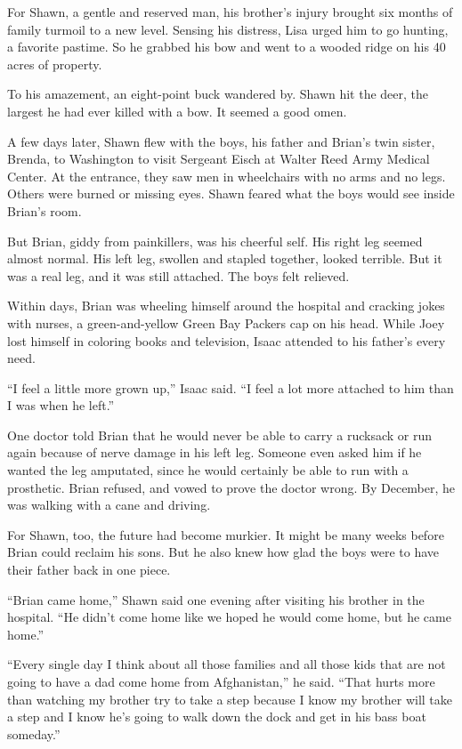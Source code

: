 ﻿\documentclass[12pt]{article}
\begin{document}
For Shawn, a gentle and reserved man, his brother's injury brought six months of family turmoil to a
new level. Sensing his distress, Lisa urged him to go hunting, a favorite pastime. So he grabbed his
bow and went to a wooded ridge on his 40 acres of property.

To his amazement, an eight-point buck wandered by. Shawn hit the deer, the largest he had ever
killed with a bow. It seemed a good omen.

A few days later, Shawn flew with the boys, his father and Brian's twin sister, Brenda, to
Washington to visit Sergeant Eisch at Walter Reed Army Medical Center. At the entrance, they saw men
in wheelchairs with no arms and no legs. Others were burned or missing eyes. Shawn feared what the
boys would see inside Brian's room.

But Brian, giddy from painkillers, was his cheerful self. His right leg seemed almost normal. His
left leg, swollen and stapled together, looked terrible. But it was a real leg, and it was still
attached. The boys felt relieved.

Within days, Brian was wheeling himself around the hospital and cracking jokes with nurses, a
green-and-yellow Green Bay Packers cap on his head. While Joey lost himself in coloring books and
television, Isaac attended to his father's every need.

``I feel a little more grown up,'' Isaac said. ``I feel a lot more attached to him than I was when
he left.''

One doctor told Brian that he would never be able to carry a rucksack or run again because of nerve
damage in his left leg. Someone even asked him if he wanted the leg amputated, since he would
certainly be able to run with a prosthetic. Brian refused, and vowed to prove the doctor wrong. By
December, he was walking with a cane and driving.

For Shawn, too, the future had become murkier. It might be many weeks before Brian could reclaim his
sons. But he also knew how glad the boys were to have their father back in one piece.

``Brian came home,'' Shawn said one evening after visiting his brother in the hospital. ``He didn't
come home like we hoped he would come home, but he came home.''

``Every single day I think about all those families and all those kids that are not going to have a
dad come home from Afghanistan,'' he said. ``That hurts more than watching my brother try to take a
step because I know my brother will take a step and I know he's going to walk down the dock and get
in his bass boat someday.''
\end{document}
